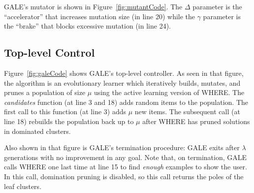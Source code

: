 \documentclass[10pt,journal,compsoc]{IEEEtran}
\newcommand{\fig}[1]{Figure~\ref{fig:#1}}
\newenvironment{changed}{\par}{\par}
\begin{document}
\begin{changed}
GALE's mutator is shown in \fig{mutantCode}.
The $\Delta$ parameter is the ``accelerator'' that increases mutation size (in line 20) while the  $\gamma$ parameter is the ``brake'' that blocks excessive mutation (in line 24).

\end{changed}

\subsection{Top-level Control}

\fig{galeCode} shows GALE's top-level controller.  
As seen in that figure, the algorithm  is an evolutionary learner which iteratively builds, mutates, and prunes a population of size $\mu$ using the active learning version of WHERE.
The {\em candidates} function (at line 3 and 18) adds random items to the population. 
The first call to this function (at line 3) adds $\mu$ new items. The subsequent call (at line 18) rebuilds the population back up to $\mu$ after WHERE has pruned solutions in dominated clusters.

Also shown in that figure is GALE's termination procedure: GALE exits after $\lambda$ generations with no improvement in any goal.
Note that, on termination, GALE calls WHERE one last time at line 15 to find {\em enough} examples to show the user. 
In this call, domination pruning is disabled, so this call returns the poles of the leaf clusters.
\end{document}
